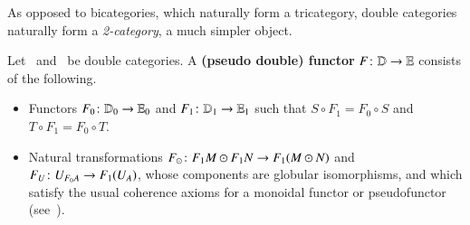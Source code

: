 \documentclass{amsart}
\begin{document}

As opposed to bicategories, which naturally form a tricategory, double
categories naturally form a \emph{2-category}, a much simpler object.

\begin{defn}
  Let \lD\ and \lE\ be double categories.  A \textbf{(pseudo double)
    functor} $F\colon \mathbb{D}\to \mathbb{E}$ consists of the following.
  \begin{itemize}
  \item Functors $F_0\colon \mathbb{D}_0 \to \mathbb{E}_0$ and $F_1\colon \mathbb{D}_1 \to
    \mathbb{E}_1$ such that $S\circ F_1 = F_0\circ S$ and $T\circ F_1 =
    F_0\circ T$.
  \item Natural transformations $F_\odot\colon F_1M \odot F_1N \to
    F_1(M\odot N)$ and $F_U\colon U_{F_0 A} \to F_1(U_A)$, whose
    components are globular isomorphisms, and which satisfy the usual
    coherence axioms for a monoidal functor or pseudofunctor
    (see~\cite[\S{}XI.2]{maclane}).
  \end{itemize}
\end{defn}
\end{document}
